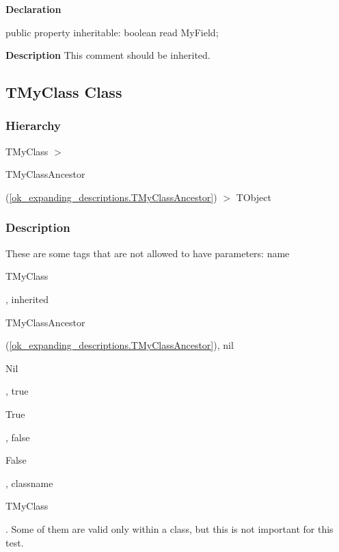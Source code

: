 \documentclass{report}
\begin{document}
\begin{list}{}{
\setlength{\itemindent}{0cm}
\setlength{\listparindent}{0cm}
\setlength{\leftmargin}{\evensidemargin}
\addtolength{\leftmargin}{\tmplength}
\settowidth{\labelsep}{X}
\addtolength{\leftmargin}{\labelsep}
\setlength{\labelwidth}{\tmplength}
}
\begin{flushleft}
\item[\textbf{Declaration}\hfill]
\begin{ttfamily}
public property inheritable: boolean read MyField;\end{ttfamily}


\end{flushleft}
\par
\item[\textbf{Description}]
This comment should be inherited.

\end{list}
\subsection*{TMyClass Class}
\subsubsection*{\large{\textbf{Hierarchy}}\normalsize\hspace{1ex}\hfill}
TMyClass {$>$} \begin{ttfamily}TMyClassAncestor\end{ttfamily}(\ref{ok_expanding_descriptions.TMyClassAncestor}) {$>$} 
TObject
\subsubsection*{\large{\textbf{Description}}\normalsize\hspace{1ex}\hfill}
These are some tags that are not allowed to have parameters: name \begin{ttfamily}TMyClass\end{ttfamily}, inherited \begin{ttfamily}TMyClassAncestor\end{ttfamily}(\ref{ok_expanding_descriptions.TMyClassAncestor}), nil \begin{ttfamily}Nil\end{ttfamily}, true \begin{ttfamily}True\end{ttfamily}, false \begin{ttfamily}False\end{ttfamily}, classname \begin{ttfamily}TMyClass\end{ttfamily}. Some of them are valid only within a class, but this is not important for this test.
\end{document}
